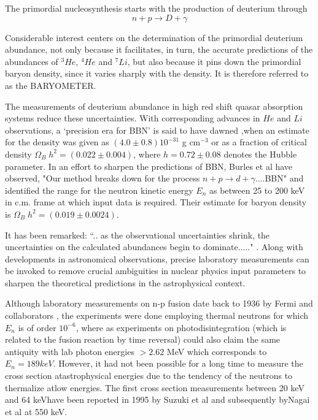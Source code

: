 The primordial nucleosynthesis starts with the production of deuterium through
$$
n+p \to D+ \gamma
$$

Considerable interest centers on the determination of the primordial deuterium abundance, not only because it facilitates, in turn, the accurate predictions of the abundances of $^3He$, $^4He$ and $^7Li$, but also because it pins down the primordial baryon density, since it varies sharply with  the density. It is therefore referred to as the BARYOMETER.

The measurements of deuterium abundance in high red shift quasar absorption systems \cite{key15} reduce these uncertainties. With corresponding advances in $He$ and $Li$ observations, a `precision era for BBN' is said to have dawned \cite{key16},when an estimate for the density was given as $(4.0 \pm 0.8) 10^{-31}$ g cm$^{-3}$ or as a fraction of critical density $\Omega_B \;h^{2} = (0.022\pm 0.004)$, where $h=0.72\pm 0.08$ denotes the Hubble parameter.   In an effort to sharpen the predictions of BBN, Burles et al \cite{key17} have observed, "Our method breaks down for the process $n + p \to d+\gamma$....BBN" and identified the range for the neutron kinetic energy $E_n$ as between 25 to 200 keV in c.m. frame at which input data is required. Their estimate for baryon density  is $\Omega_B \;h^{2} = (0.019\pm 0.0024)$. 

It has been remarked: ``.. as the observational uncertainties shrink, the uncertainties on the  calculated abundances begin to dominate....." \cite {key18}. Along with  developments in astronomical observations, precise laboratory measurements can be invoked to remove crucial ambiguities in nuclear  physics input parameters to sharpen the theoretical predictions in the astrophysical context. 

Although laboratory  measurements on n-p fusion date back to 1936 by Fermi and collaborators \cite{key19}, the experiments were done employing thermal neutrons for which $E_n$ is of order $10^{-6}$, where as experiments on  photodisintegration (which is related to the fusion reaction by time reversal) could also claim the same antiquity with lab photon energies $> 2.62$ MeV which corresponds to $E_n = 189 keV$. However, it had not been possible  for a long time to measure the cross section atastrophysical energies due to the tendency of the neutrons to thermalize atlow energies. The first cross section measurements between 20 keV and 64 keVhave been reported in 1995 by Suzuki et al \cite{key20} and subsequently byNagai et al \cite{key21} at 550 keV. 

